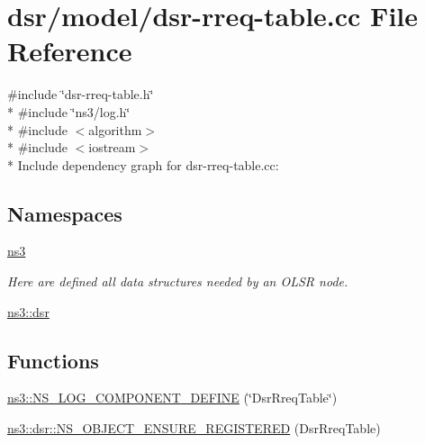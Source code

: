 \hypertarget{dsr-rreq-table_8cc}{}\section{dsr/model/dsr-\/rreq-\/table.cc File Reference}
\label{dsr-rreq-table_8cc}
{\ttfamily \#include \char`\"{}dsr-\/rreq-\/table.\+h\char`\"{}}\\*
{\ttfamily \#include \char`\"{}ns3/log.\+h\char`\"{}}\\*
{\ttfamily \#include $<$algorithm$>$}\\*
{\ttfamily \#include $<$iostream$>$}\\*
Include dependency graph for dsr-\/rreq-\/table.cc\+:
\subsection*{Namespaces}
\begin{DoxyCompactItemize}
\item 
 \hyperlink{namespacens3}{ns3}
\begin{DoxyCompactList}\small\item\em Here are defined all data structures needed by an O\+L\+SR node. \end{DoxyCompactList}\item 
 \hyperlink{namespacens3_1_1dsr}{ns3\+::dsr}
\end{DoxyCompactItemize}
\subsection*{Functions}
\begin{DoxyCompactItemize}
\item 
\hyperlink{namespacens3_aac54f1d302fb042f8c85d8dd81f37281}{ns3\+::\+N\+S\+\_\+\+L\+O\+G\+\_\+\+C\+O\+M\+P\+O\+N\+E\+N\+T\+\_\+\+D\+E\+F\+I\+NE} (\char`\"{}Dsr\+Rreq\+Table\char`\"{})
\item 
\hyperlink{namespacens3_1_1dsr_aeea952d6616879550e43c4b98524f3ba}{ns3\+::dsr\+::\+N\+S\+\_\+\+O\+B\+J\+E\+C\+T\+\_\+\+E\+N\+S\+U\+R\+E\+\_\+\+R\+E\+G\+I\+S\+T\+E\+R\+ED} (Dsr\+Rreq\+Table)
\end{DoxyCompactItemize}
